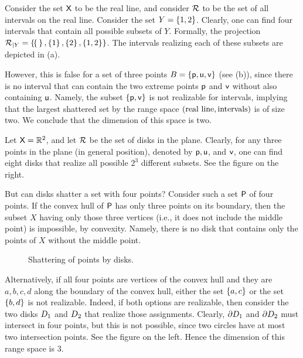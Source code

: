 Consider the set $\textsf{X}$ to be the real line, and consider
${\mathcal{R}}$ to be the set of all intervals on the real line.
Consider the set $Y = \left\{ {1,2} \right\}$.  Clearly, one can find four
intervals that contain all possible subsets of $Y$.  Formally, the
projection
${\mathcal{R}}_{|Y} = \left\{ { \! \left\{ {\,} \right\}, \left\{ { 1 } \right\},
   \left\{ {2} \right\}, \left\{ {1,2} \right\} } \right\}$. The intervals realizing each of these
subsets are depicted in  (a).

However, this is false for a set of three
points $B = \left\{ {\mathsf{p},\mathsf{u},\mathsf{v}} \right\}$ (see  (b)),
since there is no interval that
can contain the two extreme points $\mathsf{p}$ and $\mathsf{v}$ without also
containing $\mathsf{u}$. Namely, the subset $\left\{ {\mathsf{p},\mathsf{v}} \right\}$ is not
realizable for intervals, implying that the largest shattered set by
the range space $\pth[]{\text{real line}, \text{intervals} }$ is of
size two. We conclude that the \VC dimension of this space is two.



Let $\textsf{X} = \mathbb{R}^2$, and let ${\mathcal{R}}$ be the set of disks in the
plane. Clearly, for any three points in the plane (in general position),
denoted by $\mathsf{p}, \mathsf{u}$, and $\mathsf{v}$, one can find eight disks that
realize all possible $2^3$ different subsets.  See the figure on the
right.

But can disks shatter a set with four points? Consider such a set
${\mathsf{P}}$ of four points. If the convex hull of ${\mathsf{P}}$ has only three
points on its boundary, then the subset $X$ having only those three
vertices (i.e., it does not include the middle point) is impossible, by
convexity. Namely, there is no disk that contains only the points of $X$
without the middle point.
\begin{figure}[h]
    \centering%
    \caption{Shattering of points by disks.}
\end{figure}



Alternatively, if all four points are vertices of the convex hull and
they are $a,b,c,d$ along the boundary of the convex hull, either the set
$\left\{ {a, c} \right\}$ or the set $\left\{ {b, d} \right\}$ is not realizable. Indeed, if both
options are realizable, then consider the two disks $D_1$ and
$D_2$ that realize those assignments.  Clearly, ${\partial} D_1$ and
${\partial} D_2$ must intersect in four points, but this is not possible, since
two circles have at most two intersection points. See the figure on the
left.  Hence the \VC dimension of this range space is $3$.

